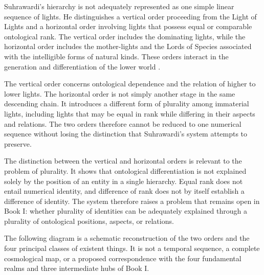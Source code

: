 \label{para:VS.B01.P01.C08.S14.SS09.P001}

Suhrawardi's hierarchy is not adequately represented
as one simple linear sequence of lights. He
distinguishes a vertical order proceeding from
the Light of Lights and a horizontal order
involving lights that possess equal or comparable
ontological rank. The vertical order includes
the dominating lights, while the horizontal
order includes the mother-lights and the
Lords of Species associated with the
intelligible forms of natural kinds. These
orders interact in the generation and
differentiation of the lower world
\citep[Part II, §§141--156, 183--184]{SuhrawardiPhilosophyIllumination}.

\label{para:VS.B01.P01.C08.S14.SS09.P002}

The vertical order concerns ontological dependence
and the relation of higher to lower lights.
The horizontal order is not simply another
stage in the same descending chain. It
introduces a different form of plurality
among immaterial lights, including lights
that may be equal in rank while differing
in their aspects and relations. The two
orders therefore cannot be reduced to
one numerical sequence without losing
the distinction that Suhrawardi's system
attempts to preserve.

\label{para:VS.B01.P01.C08.S14.SS09.P003}

The distinction between the vertical and
horizontal orders is relevant to the
problem of plurality. It shows that
ontological differentiation is not
explained solely by the position of an
entity in a single hierarchy. Equal
rank does not entail numerical identity,
and difference of rank does not by
itself establish a difference of identity.
The system therefore raises a problem
that remains open in Book I: whether
plurality of identities can be adequately
explained through a plurality of
ontological positions, aspects, or
relations.

\label{para:VS.B01.P01.C08.S14.SS09.P004}

The following diagram is a schematic reconstruction
of the two orders and the four principal classes
of existent things. It is not a temporal sequence,
a complete cosmological map, or a proposed
correspondence with the four fundamental
realms and three intermediate hubs of Book I.

